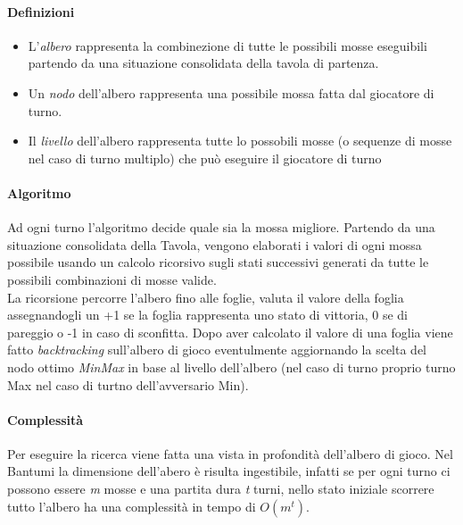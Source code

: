 \documentclass[paper=a4, fontsize=11pt]{scrartcl}	%
\numberwithin{equation}{section}															%
\numberwithin{figure}{section}																%
\numberwithin{table}{section}																%
\begin{document}
\paragraph{Definizioni}
\begin{itemize}
\item L'\textit{albero} rappresenta la combinezione di tutte le possibili mosse eseguibili partendo da una situazione consolidata della tavola di partenza.
\item Un \textit{nodo} dell'albero rappresenta una possibile mossa fatta dal giocatore di turno.
\item Il \textit{livello} dell'albero rappresenta tutte lo possobili mosse (o sequenze di mosse nel caso di turno multiplo) che pu\`o eseguire il giocatore di turno
\end{itemize}

\paragraph{Algoritmo}
Ad ogni turno l'algoritmo decide quale sia la mossa migliore. Partendo da una situazione consolidata della Tavola, vengono elaborati i valori di ogni mossa possibile usando un calcolo ricorsivo sugli stati successivi generati da tutte le possibili combinazioni di mosse valide.\\
La ricorsione percorre l'albero fino alle foglie, valuta il valore della foglia assegnandogli un +1 se la foglia rappresenta uno stato di vittoria, 0 se di pareggio o -1 in caso di sconfitta. 
Dopo aver calcolato il valore di una foglia viene fatto \textit{ backtracking} sull'albero di gioco eventulmente aggiornando la scelta del nodo ottimo \textit{ MinMax} in base al livello dell'albero (nel caso di turno proprio turno Max nel caso di turtno dell'avversario Min).

\paragraph{Complessit\`a}
Per eseguire la ricerca viene fatta una vista in profondit\`a dell'albero di gioco. Nel Bantumi la dimensione dell'abero \`e risulta ingestibile, infatti se per ogni turno ci possono essere \textit{ m} mosse e una partita dura \textit{ t} turni, nello stato iniziale scorrere tutto l'albero ha una complessit\`a in tempo di $O(m^t)$.
\end{document}
